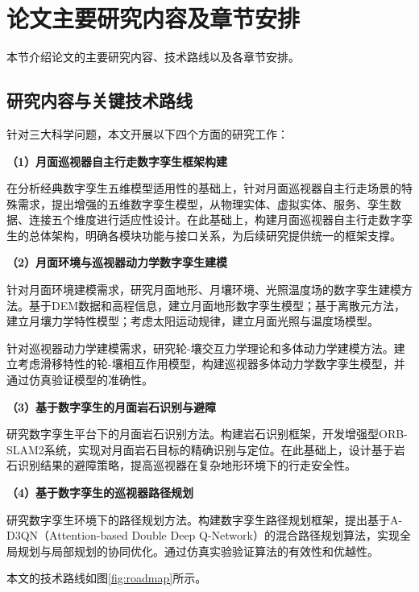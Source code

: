 \section{论文主要研究内容及章节安排}
\label{sec:content_arrangement}

本节介绍论文的主要研究内容、技术路线以及各章节安排。

\subsection{研究内容与关键技术路线}
\label{subsec:research_content}

针对三大科学问题，本文开展以下四个方面的研究工作：

\textbf{（1）月面巡视器自主行走数字孪生框架构建}

在分析经典数字孪生五维模型适用性的基础上，针对月面巡视器自主行走场景的特殊需求，提出增强的五维数字孪生模型，从物理实体、虚拟实体、服务、孪生数据、连接五个维度进行适应性设计。在此基础上，构建月面巡视器自主行走数字孪生的总体架构，明确各模块功能与接口关系，为后续研究提供统一的框架支撑。

\textbf{（2）月面环境与巡视器动力学数字孪生建模}

针对月面环境建模需求，研究月面地形、月壤环境、光照温度场的数字孪生建模方法。基于DEM数据和高程信息，建立月面地形数字孪生模型；基于离散元方法，建立月壤力学特性模型；考虑太阳运动规律，建立月面光照与温度场模型。

针对巡视器动力学建模需求，研究轮-壤交互力学理论和多体动力学建模方法。建立考虑滑移特性的轮-壤相互作用模型，构建巡视器多体动力学数字孪生模型，并通过仿真验证模型的准确性。

\textbf{（3）基于数字孪生的月面岩石识别与避障}

研究数字孪生平台下的月面岩石识别方法。构建岩石识别框架，开发增强型ORB-SLAM2系统，实现对月面岩石目标的精确识别与定位。在此基础上，设计基于岩石识别结果的避障策略，提高巡视器在复杂地形环境下的行走安全性。

\textbf{（4）基于数字孪生的巡视器路径规划}

研究数字孪生环境下的路径规划方法。构建数字孪生路径规划框架，提出基于A-D3QN（Attention-based Double Deep Q-Network）的混合路径规划算法，实现全局规划与局部规划的协同优化。通过仿真实验验证算法的有效性和优越性。

本文的技术路线如图\ref{fig:roadmap}所示。

